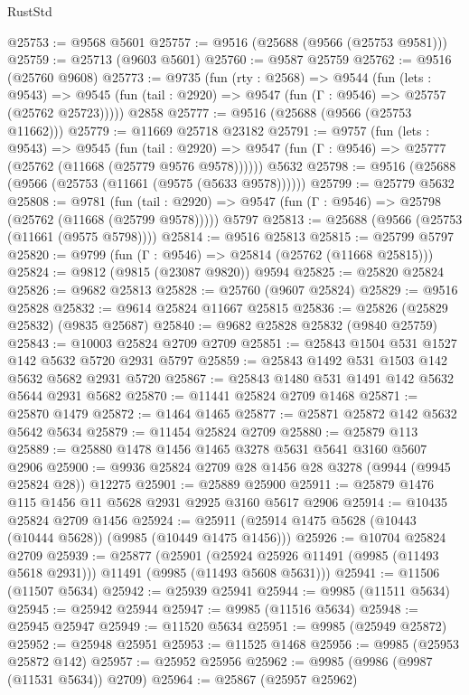 \begin{lexlean}{RustStd}
\begin{coremodule}
@25753 := @9568 @5601
@25757 := @9516 (@25688 (@9566 (@25753 @9581)))
@25759 := @25713 (@9603 @5601)
@25760 := @9587 @25759
@25762 := @9516 (@25760 @9608)
@25773 := @9735
    (fun (rty : @2568) =>
    @9544
      (fun (lets : @9543) =>
      @9545 (fun (tail : @2920) => @9547 (fun (Γ : @9546) => @25757 (@25762 @25723)))))
    @2858
@25777 := @9516 (@25688 (@9566 (@25753 @11662)))
@25779 := @11669 @25718 @23182
@25791 := @9757
    (fun (lets : @9543) =>
    @9545
      (fun (tail : @2920) =>
      @9547 (fun (Γ : @9546) => @25777 (@25762 (@11668 (@25779 @9576 @9578))))))
    @5632
@25798 := @9516 (@25688 (@9566 (@25753 (@11661 (@9575 (@5633 @9578))))))
@25799 := @25779 @5632
@25808 := @9781
    (fun (tail : @2920) => @9547 (fun (Γ : @9546) => @25798 (@25762 (@11668 (@25799 @9578)))))
    @5797
@25813 := @25688 (@9566 (@25753 (@11661 (@9575 @5798))))
@25814 := @9516 @25813
@25815 := @25799 @5797
@25820 := @9799 (fun (Γ : @9546) => @25814 (@25762 (@11668 @25815)))
@25824 := @9812 (@9815 (@23087 @9820)) @9594
@25825 := @25820 @25824
@25826 := @9682 @25813
@25828 := @25760 (@9607 @25824)
@25829 := @9516 @25828
@25832 := @9614 @25824 @11667 @25815
@25836 := @25826 (@25829 @25832) (@9835 @25687)
@25840 := @9682 @25828 @25832 (@9840 @25759)
@25843 := @10003 @25824 @2709 @2709
@25851 := @25843 @1504 @531 @1527 @142 @5632 @5720 @2931 @5797
@25859 := @25843 @1492 @531 @1503 @142 @5632 @5682 @2931 @5720
@25867 := @25843 @1480 @531 @1491 @142 @5632 @5644 @2931 @5682
@25870 := @11441 @25824 @2709 @1468
@25871 := @25870 @1479
@25872 := @1464 @1465
@25877 := @25871 @25872 @142 @5632 @5642 @5634
@25879 := @11454 @25824 @2709
@25880 := @25879 @113
@25889 := @25880 @1478 @1456 @1465 @3278 @5631 @5641 @3160 @5607 @2906
@25900 := @9936 @25824 @2709 @28 @1456 @28 @3278 (@9944 (@9945 @25824 @28)) @12275
@25901 := @25889 @25900
@25911 := @25879 @1476 @115 @1456 @11 @5628 @2931 @2925 @3160 @5617 @2906
@25914 := @10435 @25824 @2709 @1456
@25924 := @25911 (@25914 @1475 @5628 (@10443 (@10444 @5628)) (@9985 (@10449 @1475 @1456)))
@25926 := @10704 @25824 @2709
@25939 := @25877
    (@25901 (@25924 @25926 @11491 (@9985 (@11493 @5618 @2931))) @11491 (@9985 (@11493 @5608 @5631)))
@25941 := @11506 (@11507 @5634)
@25942 := @25939 @25941
@25944 := @9985 (@11511 @5634)
@25945 := @25942 @25944
@25947 := @9985 (@11516 @5634)
@25948 := @25945 @25947
@25949 := @11520 @5634
@25951 := @9985 (@25949 @25872)
@25952 := @25948 @25951
@25953 := @11525 @1468
@25956 := @9985 (@25953 @25872 @142)
@25957 := @25952 @25956
@25962 := @9985 (@9986 (@9987 (@11531 @5634)) @2709)
@25964 := @25867 (@25957 @25962)

\end{coremodule}
\end{lexlean}

